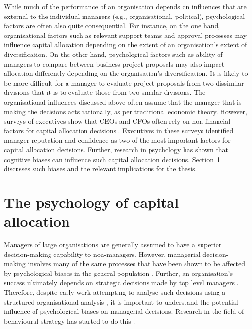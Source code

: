 \documentclass[a4paper, nobind, dvipsnames]{templates/ociamthesis}
\theoremstyle{definition}
\theoremstyle{definition}
\theoremstyle{definition}
\theoremstyle{definition}
\theoremstyle{remark}
\begin{document}
While much of the performance of an organisation depends on influences that are
external to the individual managers (e.g., organisational, political),
psychological factors are often also quite consequential. For instance, on the
one hand, organisational factors such as relevant support teams and approval
processes may influence capital allocation depending on the extent of an
organisation's extent of diversification. On the other hand, psychological
factors such as ability of managers to compare between business project
proposals may also impact allocation differently depending on the organisation's
diversification. It is likely to be more difficult for a manager to evaluate
project proposals from two dissimilar divisions that it is to evaluate those
from two similar divisions. The organisational influences discussed above often
assume that the manager that is making the decisions acts rationally, as per
traditional economic theory. However, surveys of executives show that CEOs and
CFOs often rely on non-financial factors for capital allocation decisions
\autocite{graham2015}. Executives in these surveys identified manager reputation and
confidence as two of the most important factors for capital allocation
decisions. Further, research in psychology has shown that cognitive biases can
influence such capital allocation decisions. Section~\ref{psychology} discusses
such biases and the relevant implications for the thesis.

\hypertarget{psychology}{%
\section{The psychology of capital allocation}\label{psychology}}

Managers of large organisations are generally assumed to have a superior
decision-making capability to non-managers. However, managerial decision-making
involves many of the same processes that have been shown to be affected by
psychological biases in the general population \autocite{schwenk1984,das1999,mccray2002}. Further, an organisation's success ultimately depends on strategic
decisions made by top level managers \autocite{mazzolini1981}. Therefore, despite early
work attempting to analyse such decisions using a structured organisational
analysis \autocite[e.g.,][]{mintzberg1976}, it is important to understand the potential
influence of psychological biases on managerial decisions. Research in the field
of behavioural strategy has started to do this \autocite{powell2011}.
\end{document}

